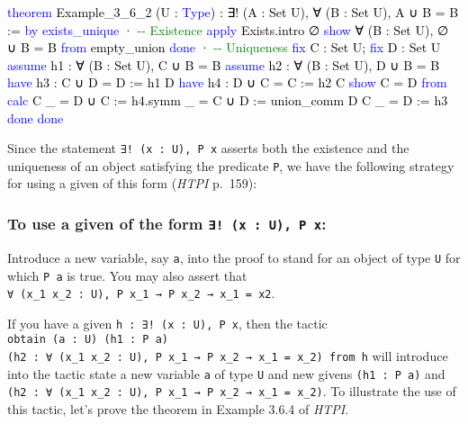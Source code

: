 \documentclass[
  letterpaper,
  DIV=11,
  numbers=noendperiod]{scrreprt}
\newenvironment{Shaded}{\begin{snugshade}}{\end{snugshade}}
\newcommand{\CommentTok}[1]{\textcolor[rgb]{0.37,0.37,0.37}{#1}}
\newcommand{\KeywordTok}[1]{\textcolor[rgb]{0.00,0.23,0.31}{#1}}
\newcommand{\NormalTok}[1]{\textcolor[rgb]{0.00,0.23,0.31}{#1}}
\renewcommand{\NormalTok}[1]{\textcolor[HTML]{000000}{#1}}
\renewcommand{\KeywordTok}[1]{\textcolor[HTML]{0000FF}{#1}}
\renewcommand{\CommentTok}[1]{\textcolor[HTML]{008000}{#1}}
\newenvironment{ind}
	{\begin{list}{}{\setlength{\leftmargin}{1em}}\item\relax}
	{\end{list}}
\theoremstyle{remark}
\begin{document}
\begin{Shaded}
\begin{Highlighting}[]
\KeywordTok{theorem}\NormalTok{ Example\_3\_6\_2 (U : }\KeywordTok{Type}\NormalTok{) :}
\NormalTok{    ∃! (A : Set U), ∀ (B : Set U),}
\NormalTok{    A ∪ B = B := }\KeywordTok{by}
  \KeywordTok{exists\_unique}
\NormalTok{  · }\CommentTok{{-}{-} Existence}
    \KeywordTok{apply}\NormalTok{ Exists.intro ∅}
    \KeywordTok{show}\NormalTok{ ∀ (B : Set U), ∅ ∪ B = B }\KeywordTok{from}\NormalTok{ empty\_union}
    \KeywordTok{done}
\NormalTok{  · }\CommentTok{{-}{-} Uniqueness}
    \KeywordTok{fix}\NormalTok{ C : Set U; }\KeywordTok{fix}\NormalTok{ D : Set U}
    \KeywordTok{assume}\NormalTok{ h1 : ∀ (B : Set U), C ∪ B = B}
    \KeywordTok{assume}\NormalTok{ h2 : ∀ (B : Set U), D ∪ B = B}
    \KeywordTok{have}\NormalTok{ h3 : C ∪ D = D := h1 D}
    \KeywordTok{have}\NormalTok{ h4 : D ∪ C = C := h2 C }
    \KeywordTok{show}\NormalTok{ C = D }\KeywordTok{from}
      \KeywordTok{calc}\NormalTok{ C}
\NormalTok{        \_ = D ∪ C := h4.symm}
\NormalTok{        \_ = C ∪ D := union\_comm D C}
\NormalTok{        \_ = D := h3}
    \KeywordTok{done}
  \KeywordTok{done}
\end{Highlighting}
\end{Shaded}

Since the statement \texttt{∃!\ (x\ :\ U),\ P\ x} asserts both the
existence and the uniqueness of an object satisfying the predicate
\texttt{P}, we have the following strategy for using a given of this
form (\emph{HTPI} p.~159):

\hypertarget{to-use-a-given-of-the-form-x-u-p-x-2}{%
\subsubsection{\texorpdfstring{To use a given of the form
\texttt{∃!\ (x\ :\ U),\ P\ x}:}{To use a given of the form ∃! (x : U), P x:}}\label{to-use-a-given-of-the-form-x-u-p-x-2}}

\begin{ind}
Introduce a new variable, say \texttt{a}, into the proof to stand for an
object of type \texttt{U} for which \texttt{P\ a} is true. You may also
assert that
\texttt{∀\ (x\_1\ x\_2\ :\ U),\ P\ x\_1\ →\ P\ x\_2\ →\ x\_1\ =\ x2}.

\end{ind}

If you have a given \texttt{h\ :\ ∃!\ (x\ :\ U),\ P\ x}, then the tactic
\texttt{obtain\ (a\ :\ U)\ (h1\ :\ P\ a)}
\texttt{(h2\ :\ ∀\ (x\_1\ x\_2\ :\ U),\ P\ x\_1\ →\ P\ x\_2\ →\ x\_1\ =\ x\_2)\ from\ h}
will introduce into the tactic state a new variable \texttt{a} of type
\texttt{U} and new givens \texttt{(h1\ :\ P\ a)} and
\texttt{(h2\ :\ ∀\ (x\_1\ x\_2\ :\ U),\ P\ x\_1\ →\ P\ x\_2\ →\ x\_1\ =\ x\_2)}.
To illustrate the use of this tactic, let's prove the theorem in Example
3.6.4 of \emph{HTPI}.
\end{document}
